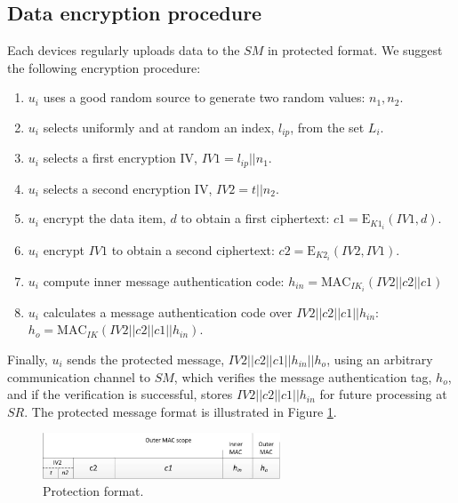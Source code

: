{\subsection{Data encryption procedure}
\label{dataprotection:encryption}
Each devices regularly uploads data to the $SM$ in protected format. We suggest the following encryption procedure:
\begin{enumerate}
    \item $u_i$ uses a good random source to generate two random values: $n_1,n_2$.
    \item $u_i$ selects uniformly and at random an index, $l_{ip}$, from the set $L_i$.
    \item $u_i$ selects a first encryption IV, $IV1 = l_{ip}||n_1$.
    \item $u_i$ selects a second encryption IV, $IV2 = t||n_2$.
    \item $u_i$ encrypt the data item, $d$ to obtain a first ciphertext: $c1 = \text{E}_{K1_i}(IV1,d)$.
    \item $u_i$ encrypt $IV1$ to obtain a second ciphertext: $c2= \text{E}_{K2_i}(IV2,IV1)$.
    \item $u_i$ compute inner message authentication code: $h_{in} = \text{MAC}_{IK_i}(IV2||c2||c1)$           
    \item $u_i$ calculates a message authentication code over $IV2||c2||c1||h_{in}$: $h_o = \text{MAC}_{IK}(IV2||c2||c1||h_{in})$.
\end{enumerate}
Finally, $u_i$ sends the protected message, $IV2||c2||c1||h_{in}||h_o$, using an arbitrary communication channel to $SM$, which verifies the message authentication tag, $h_o$, and if the verification is successful, stores $IV2||c2||c1||h_{in}$ for future processing at $SR$. The protected message format is illustrated in Figure \ref{fig:protection}.
\begin{figure}[ht]
    \centering
    \includegraphics[width=200pt]{papers/ppiot/images/ProtectionFormat}
    \caption{Protection format.}
    \label{fig:protection}
\end{figure}
}
